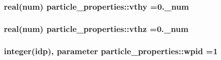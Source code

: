 \subsubsection[{\texorpdfstring{vthy}{vthy}}]{\setlength{\rightskip}{0pt plus 5cm}real(num) particle\+\_\+properties\+::vthy =0.\+\_\+num}\hypertarget{namespaceparticle__properties_a6edaa2cc58de2c03d2f9da281f25742a}{}\label{namespaceparticle__properties_a6edaa2cc58de2c03d2f9da281f25742a}
\subsubsection[{\texorpdfstring{vthz}{vthz}}]{\setlength{\rightskip}{0pt plus 5cm}real(num) particle\+\_\+properties\+::vthz =0.\+\_\+num}\hypertarget{namespaceparticle__properties_a7826780fb51369556dcbf7bd63f1ef81}{}\label{namespaceparticle__properties_a7826780fb51369556dcbf7bd63f1ef81}
\subsubsection[{\texorpdfstring{wpid}{wpid}}]{\setlength{\rightskip}{0pt plus 5cm}integer(idp), parameter particle\+\_\+properties\+::wpid =1}\hypertarget{namespaceparticle__properties_a9661ac258a1ee308b3cad93e5da3c579}{}\label{namespaceparticle__properties_a9661ac258a1ee308b3cad93e5da3c579}
